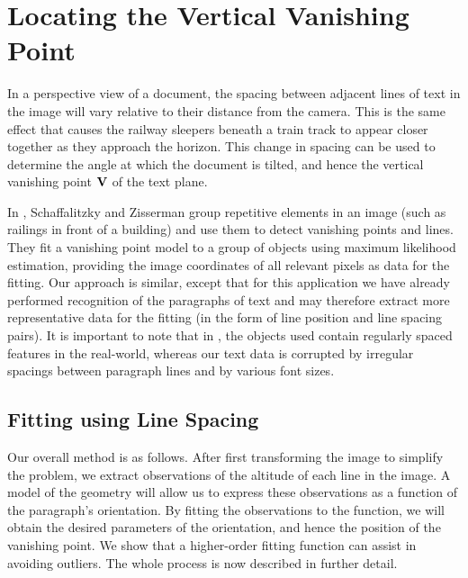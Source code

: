 
\section{Locating the Vertical Vanishing Point} \label{sec-vertvanish}


In a perspective view of a document, the spacing between adjacent lines of text
in the image will vary relative to their distance from the camera.  This is the
same effect that causes the railway sleepers beneath a train track to appear
closer together as they approach the horizon. This change in spacing can be used
to determine the angle at which the document is tilted, and hence the vertical
vanishing point ${ \bf V }$ of the text plane. 

In \cite{planargrouping}, Schaffalitzky and Zisserman group repetitive elements
in an image (such as railings in front of a building) and use them to detect 
vanishing points and lines. 
They fit a vanishing point model to a group of objects using maximum likelihood
estimation, providing the image coordinates of all relevant pixels as data for
the fitting. Our approach is similar, except that for this application we have 
already performed recognition of the paragraphs of text and may therefore 
extract more representative data for the fitting
(in the form of line position and line spacing pairs).
It is important to
note that in \cite{planargrouping}, the objects used contain regularly spaced
features in the real-world, whereas our text data is corrupted by irregular
spacings between paragraph lines and by various font sizes.


\subsection{Fitting using Line Spacing}
Our overall method is as follows. After first transforming the image to 
simplify the problem, we  extract observations of the altitude of 
each line in the image.  A model of the geometry will allow us to express 
these observations as a function of the paragraph's orientation.  By 
fitting the observations to the function, we will obtain the desired 
parameters of the orientation, and hence the position of the vanishing point.  
We show that a higher-order fitting function 
can assist in avoiding outliers. The whole process is now described in
further detail.

